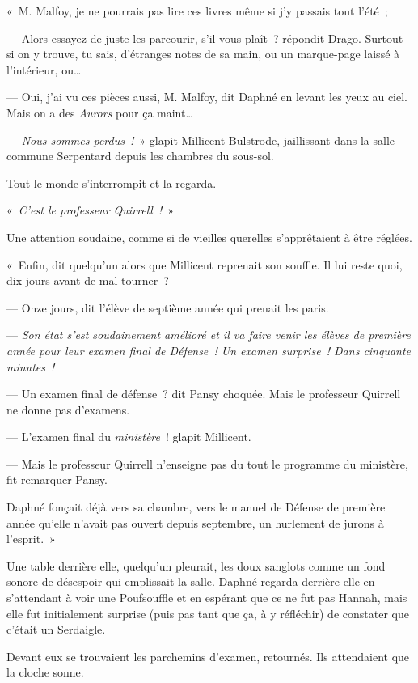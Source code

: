 «~M. Malfoy, je ne pourrais pas lire ces livres même si j'y passais tout l'été~;

--- Alors essayez de juste les parcourir, s'il vous plaît~? répondit Drago. Surtout si on y trouve, tu sais, d'étranges notes de sa main, ou un marque-page laissé à l'intérieur, ou…

--- Oui, j'ai vu ces pièces aussi, M. Malfoy, dit Daphné en levant les yeux au ciel. Mais on a des \emph{Aurors} pour ça maint…

--- \emph{Nous sommes perdus~!}~» glapit Millicent Bulstrode, jaillissant dans la salle commune Serpentard depuis les chambres du sous-sol.

Tout le monde s'interrompit et la regarda.

«~\emph{C'est le professeur Quirrell~!}~»

Une attention soudaine, comme si de vieilles querelles s'apprêtaient à être réglées.

«~Enfin, dit quelqu'un alors que Millicent reprenait son souffle. Il lui reste quoi, dix jours avant de mal tourner~?

--- Onze jours, dit l'élève de septième année qui prenait les paris.

--- \emph{Son état s'est soudainement amélioré et il va faire venir les élèves de première année pour leur examen final de Défense~! Un examen surprise~! Dans cinquante minutes~!}

--- Un examen final de défense~? dit Pansy choquée. Mais le professeur Quirrell ne donne pas d'examens.

--- L'examen final du \emph{ministère}~! glapit Millicent.

--- Mais le professeur Quirrell n'enseigne pas du tout le programme du ministère, fit remarquer Pansy.

Daphné fonçait déjà vers sa chambre, vers le manuel de Défense de première année qu'elle n'avait pas ouvert depuis septembre, un hurlement de jurons à l'esprit.~»

\later

Une table derrière elle, quelqu'un pleurait, les doux sanglots comme un fond sonore de désespoir qui emplissait la salle. Daphné regarda derrière elle en s'attendant à voir une Poufsouffle et en espérant que ce ne fut pas Hannah, mais elle fut initialement surprise (puis pas tant que ça, à y réfléchir) de constater que c'était un Serdaigle.

Devant eux se trouvaient les parchemins d'examen, retournés. Ils attendaient que la cloche sonne.

